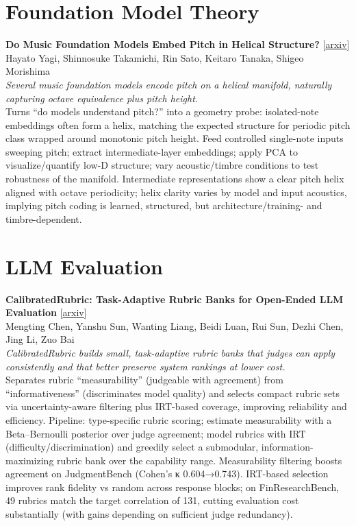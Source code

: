 \documentclass[12pt,letterpaper]{article}
\begin{document}
\medskip


\section*{Foundation Model Theory}

{\small\textbf{Do Music Foundation Models Embed Pitch in Helical Structure?}} {\scriptsize[\href{https://arxiv.org/abs/2607.29086}{arxiv}]}\\
{\scriptsize Hayato Yagi, Shinnosuke Takamichi, Rin Sato, Keitaro Tanaka, Shigeo Morishima}\\

{\small\textit{Several music foundation models encode pitch on a helical manifold, naturally capturing octave equivalence plus pitch height.}}\\[1pt]
{\footnotesize Turns ``do models understand pitch?'' into a geometry probe: isolated-note embeddings often form a helix, matching the expected structure for periodic pitch class wrapped around monotonic pitch height. Feed controlled single-note inputs sweeping pitch; extract intermediate-layer embeddings; apply PCA to visualize/quantify low-D structure; vary acoustic/timbre conditions to test robustness of the manifold. Intermediate representations show a clear pitch helix aligned with octave periodicity; helix clarity varies by model and input acoustics, implying pitch coding is learned, structured, but architecture/training- and timbre-dependent.}

\medskip


\section*{LLM Evaluation}

{\small\textbf{CalibratedRubric: Task-Adaptive Rubric Banks for Open-Ended LLM Evaluation}} {\scriptsize[\href{https://arxiv.org/abs/2607.29252}{arxiv}]}\\
{\scriptsize Mengting Chen, Yanshu Sun, Wanting Liang, Beidi Luan, Rui Sun, Dezhi Chen, Jing Li, Zuo Bai}\\

{\small\textit{CalibratedRubric builds small, task-adaptive rubric banks that judges can apply consistently and that better preserve system rankings at lower cost.}}\\[1pt]
{\footnotesize Separates rubric ``measurability'' (judgeable with agreement) from ``informativeness'' (discriminates model quality) and selects compact rubric sets via uncertainty-aware filtering plus IRT-based coverage, improving reliability and efficiency. Pipeline: type-specific rubric scoring; estimate measurability with a Beta--Bernoulli posterior over judge agreement; model rubrics with IRT (difficulty/discrimination) and greedily select a submodular, information-maximizing rubric bank over the capability range. Measurability filtering boosts agreement on JudgmentBench (Cohen's κ 0.604→0.743). IRT-based selection improves rank fidelity vs random across response blocks; on FinResearchBench, 49 rubrics match the target correlation of 131, cutting evaluation cost substantially (with gains depending on sufficient judge redundancy).}
\end{document}
